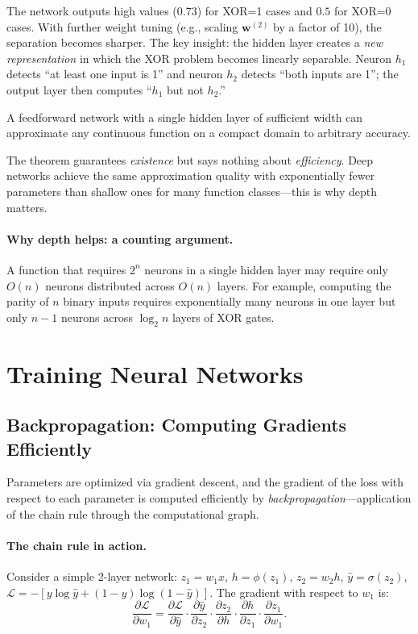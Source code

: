 The network outputs high values ($0.73$) for XOR=1 cases and $0.5$ for XOR=0 cases. With further weight tuning (e.g., scaling $\mathbf{w}^{(2)}$ by a factor of 10), the separation becomes sharper. The key insight: the hidden layer creates a \emph{new representation} in which the XOR problem becomes linearly separable. Neuron $h_1$ detects ``at least one input is 1'' and neuron $h_2$ detects ``both inputs are 1''; the output layer then computes ``$h_1$ but not $h_2$.''

\begin{theorem}
A feedforward network with a single hidden layer of sufficient width can approximate any continuous function on a compact domain to arbitrary accuracy.
\end{theorem}

The theorem guarantees \emph{existence} but says nothing about \emph{efficiency}. Deep networks achieve the same approximation quality with exponentially fewer parameters than shallow ones for many function classes---this is why depth matters.

\paragraph{Why depth helps: a counting argument.} A function that requires $2^n$ neurons in a single hidden layer may require only $O(n)$ neurons distributed across $O(n)$ layers. For example, computing the parity of $n$ binary inputs requires exponentially many neurons in one layer but only $n-1$ neurons across $\log_2 n$ layers of XOR gates.

\section{Training Neural Networks}
\label{sec:training}

\subsection{Backpropagation: Computing Gradients Efficiently}

Parameters are optimized via gradient descent, and the gradient of the loss with respect to each parameter is computed efficiently by \emph{backpropagation}---application of the chain rule through the computational graph.

\paragraph{The chain rule in action.} Consider a simple 2-layer network: $z_1 = w_1 x$, $h = \phi(z_1)$, $z_2 = w_2 h$, $\hat{y} = \sigma(z_2)$, $\mathcal{L} = -[y \log \hat{y} + (1-y)\log(1-\hat{y})]$. The gradient with respect to $w_1$ is:
\begin{equation}
\frac{\partial \mathcal{L}}{\partial w_1} = \frac{\partial \mathcal{L}}{\partial \hat{y}} \cdot \frac{\partial \hat{y}}{\partial z_2} \cdot \frac{\partial z_2}{\partial h} \cdot \frac{\partial h}{\partial z_1} \cdot \frac{\partial z_1}{\partial w_1}.
\end{equation}

